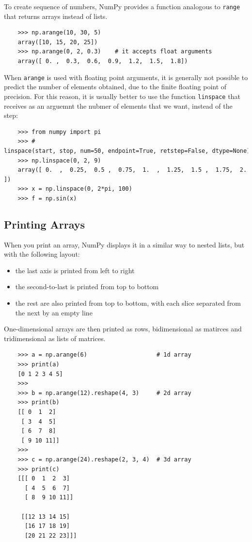 \documentclass[UTF8]{article}
\begin{document}
To create sequence of numbers, NumPy provides a function analogous to \texttt{range} that returns
arrays instead of lists.
\begin{verbatim}
    >>> np.arange(10, 30, 5)
    array([10, 15, 20, 25])
    >>> np.arange(0, 2, 0.3)    # it accepts float arguments
    array([ 0. ,  0.3,  0.6,  0.9,  1.2,  1.5,  1.8])
\end{verbatim}

When \texttt{arange} is used with floating point arguments, it is generally not possible to predict
the number of elements obtained, due to the finite floating point of precision. For this reason, it
is usually better to use the function \texttt{linspace} that receives as an arguemnt the nubmer of
elements that we want, instead of the step:
\begin{verbatim}
    >>> from numpy import pi
    >>> # linspace(start, stop, num=50, endpoint=True, retstep=False, dtype=None)
    >>> np.linspace(0, 2, 9)
    array([ 0.  ,  0.25,  0.5 ,  0.75,  1.  ,  1.25,  1.5 ,  1.75,  2.  ])
    >>> x = np.linspace(0, 2*pi, 100)
    >>> f = np.sin(x)
\end{verbatim}

\subsection{Printing Arrays}
When you print an array, NumPy displays it in a similar way to nested lists, but with the following
layout:
\begin{itemize}
    \item the last axis is printed from left to right
    \item the second-to-last is printed from top to bottom
    \item the rest are also printed from top to bottom, with each slice separated from the next by
    an empty line
\end{itemize}

One-dimensional arrays are then printed as rows, bidimensional as matirces and tridimensional as
lists of matrices.
\begin{verbatim}
    >>> a = np.arange(6)                    # 1d array
    >>> print(a)
    [0 1 2 3 4 5]
    >>>
    >>> b = np.arange(12).reshape(4, 3)     # 2d array
    >>> print(b)
    [[ 0  1  2]
     [ 3  4  5]
     [ 6  7  8]
     [ 9 10 11]]
    >>>
    >>> c = np.arange(24).reshape(2, 3, 4)  # 3d array
    >>> print(c)
    [[[ 0  1  2  3]
      [ 4  5  6  7]
      [ 8  9 10 11]]

     [[12 13 14 15]
      [16 17 18 19]
      [20 21 22 23]]]
\end{verbatim}
\end{document}
